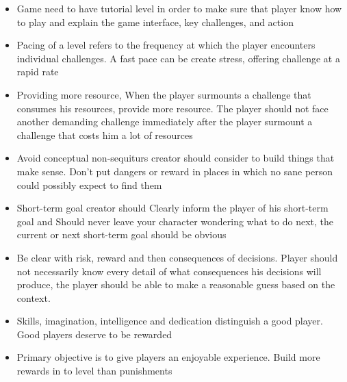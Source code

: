 \documentclass[journal]{IEEEtran}										    %
\begin{document}
                \begin{itemize}
                    \item   Game need to have tutorial level in order to make sure that 
                    player know how to play and explain the game interface, key 
                    challenges, and action
                
                    \item   Pacing of a level refers to the frequency at which the 
                    player encounters individual challenges. A fast pace can be 
                    create stress, offering challenge at a rapid rate

                    \item   Providing more resource, When the player surmounts a 
                    challenge that consumes his 	resources, provide more resource.
                    The player should not face another demanding challenge immediately 
                    after the player surmount a challenge that costs him a lot of resources
                    
                    \item   Avoid conceptual non-sequiturs creator should consider 
                    to build things that make sense. Don't put dangers or reward 
                    in places in which no sane person could possibly expect to find them
                    
                    \item   Short-term goal creator should Clearly inform the player 
                    of his short-term goal and Should never leave your character 
                    wondering what to do next, the current or next short-term goal 
                    should be obvious
                    
                    \item   Be clear with risk, reward and then consequences of decisions. 
                    Player should not necessarily know every detail of what 
                    consequences his decisions will produce, the player should be 
                    able to make a reasonable guess based on the context.

                    \item   Skills, imagination, intelligence and dedication distinguish 
                    a good player. Good players deserve to be rewarded

                    \item   Primary objective is to give players an enjoyable experience. 
                    Build more rewards in to level than punishments


\end{itemize}
\end{document}
